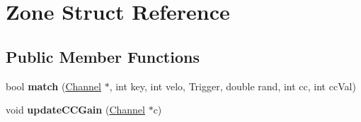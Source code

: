 \hypertarget{struct_zone}{}\section{Zone Struct Reference}
\label{struct_zone}
\subsection*{Public Member Functions}
\begin{DoxyCompactItemize}
\item 
\mbox{\label{struct_zone_a75086a30ac21ebd1cc8d39a1a5a32831}} 
bool {\bfseries match} (\hyperlink{class_channel}{Channel} $\ast$, int key, int velo, Trigger, double rand, int cc, int cc\+Val)
\item 
\mbox{\label{struct_zone_aa04bc9fc96b8543143a02acac1fec4ed}} 
void {\bfseries update\+C\+C\+Gain} (\hyperlink{class_channel}{Channel} $\ast$c)
\end{DoxyCompactItemize}
